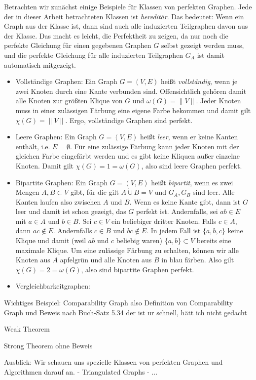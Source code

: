 \documentclass[../main.tex]{subfiles}
\begin{document}
Betrachten wir zunächst einige Beispiele für Klassen von perfekten Graphen. Jede der in dieser Arbeit betrachteten Klassen ist \emph{hereditär}. Das bedeutet: Wenn ein Graph aus der Klasse ist, dann sind auch alle induzierten Teilgraphen davon aus der Klasse. Das macht es leicht, die Perfektheit zu zeigen, da nur noch die perfekte Gleichung für einen gegebenen Graphen $G$ selbst gezeigt werden muss, und die perfekte Gleichung für alle induzierten Teilgraphen $G_A$ ist damit automatisch mitgezeigt.

\begin{itemize}
    \item Vollständige Graphen: Ein Graph $G = (V, E)$ heißt \emph{vollständig}, wenn je zwei Knoten durch eine Kante verbunden sind. Offensichtlich gehören damit alle Knoten zur größten Klique von $G$ und $\omega(G) = \|V\|$. Jeder Knoten muss in einer zulässigen Färbung eine eigene Farbe bekommen und damit gilt $\chi(G) = \|V\|$. Ergo, vollständige Graphen sind perfekt.
    \item Leere Graphen: Ein Graph $G = (V, E)$ heißt \emph{leer}, wenn er keine Kanten enthält, i.e. $E = \emptyset$. Für eine zulässige Färbung kann jeder Knoten mit der gleichen Farbe eingefärbt werden und es gibt keine Kliquen außer einzelne Knoten. Damit gilt $\chi(G) = 1 = \omega(G)$, also sind leere Graphen perfekt.
    \item Bipartite Graphen: Ein Graph $G = (V, E)$ heißt \emph{bipartit}, wenn es zwei Mengen $A, B \subset V$ gibt, für die gilt $A \dot\cup B = V$ und $G_A, G_B$ sind leer. Alle Kanten laufen also zwischen $A$ und $B$. Wenn es keine Kante gibt, dann ist $G$ leer und damit ist schon gezeigt, das $G$ perfekt ist. Andernfalls, sei $ab \in E$ mit $a \in A$ und $b \in B$. Sei $c \in V$ ein beliebiger dritter Knoten. Falls $c \in A$, dann $ac \notin E$. Andernfalls $c \in B$ und $bc \notin E$. In jedem Fall ist $\{a, b, c\}$ keine Klique und damit (weil $ab$ und $c$ beliebig waren) $\{a, b\} \subset V$ bereits eine maximale Klique. Um eine zulässige Färbung zu erhalten, können wir alle Knoten aus $A$ apfelgrün und alle Knoten aus $B$ in blau färben. Also gilt $\chi(G) = 2 = \omega(G)$, also sind bipartite Graphen perfekt.
    \item Vergleichbarkeitgraphen:
\end{itemize}

Wichtiges Beispiel: Comparability Graph
    also Definition von Comparability Graph
    und Beweis nach Buch-Satz 5.34
    der ist ur schnell, hätt ich nicht gedacht 

Weak Theorem

Strong Theorem ohne Beweis


Ausblick:
    Wir schauen uns spezielle Klassen von perfekten Graphen und Algorithmen darauf an.
        - Triangulated Graphs
        - ...
\end{document}
